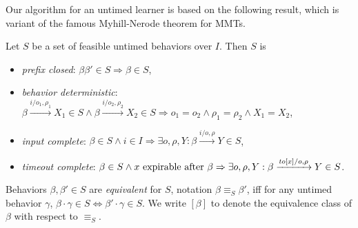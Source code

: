 Our algorithm for an untimed learner is based on the following result, which is variant of the famous 
Myhill-Nerode theorem for MMTs.

\begin{definition}
Let $S$ be a set of feasible untimed behaviors over $I$. Then $S$ is
\begin{itemize}
\item
\emph{prefix closed}: $\beta \beta' \in S \Rightarrow \beta \in S$,
\item
\emph{behavior deterministic}:
$\beta \xrightarrow{i/o_1, \rho_1} X_1 \in S \wedge \beta \xrightarrow{i/o_2, \rho_2} X_2 \in S \Rightarrow o_1 = o_2 \wedge \rho_1 = \rho_2 \wedge X_1 = X_2$,
\item
\emph{input complete}:
$\beta \in S \wedge i \in I \Rightarrow \exists o, \rho, Y : \beta \xrightarrow{i/o, \rho} Y \in S$,
\item
\emph{timeout complete}:
$\beta \in S \wedge x \mbox{ expirable after } \beta \Rightarrow
\exists o, \rho, Y: \beta \xrightarrow{\mathit{to}[x]/o, \rho} Y \in S$.
\end{itemize}
Behaviors $\beta, \beta' \in S$ are \emph{equivalent} for $S$, notation $\beta \equiv_S \beta'$, iff 
for any untimed behavior
$\gamma$, $\beta \cdot \gamma \in S \Leftrightarrow \beta' \cdot \gamma \in S$.
We write $[\beta]$ to denote the equivalence class of $\beta$ with respect to $\equiv_S$.
\end{definition}

